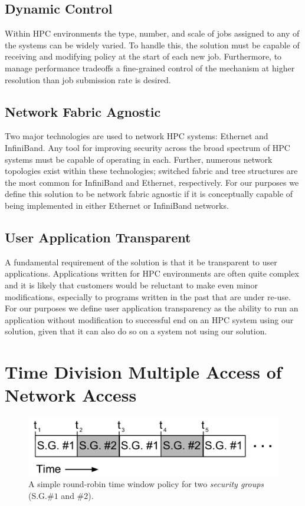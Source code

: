 \documentclass[oneside,12pt]{memoir}
\begin{document}
\section{Dynamic Control}
Within HPC environments the type, number, and scale of jobs assigned to any of the systems can be widely varied. To handle this, the solution must be capable of receiving and modifying policy at the start of each new job. Furthermore, to manage performance tradeoffs a fine-grained control of the mechanism at higher resolution than job submission rate is desired. 
\section{Network Fabric Agnostic}
Two major technologies are used to network HPC systems: Ethernet and InfiniBand. Any tool for improving security across the broad spectrum of HPC systems must be capable of operating in each. Further, numerous network topologies exist within these technologies; switched fabric and tree structures are the most common for InfiniBand and Ethernet, respectively. For our purposes we define this solution to be network fabric agnostic if it is conceptually capable of being implemented in either Ethernet or InfiniBand networks. 
\section{User Application Transparent}
A fundamental requirement of the solution is that it be transparent to user applications. Applications written for HPC environments are often quite complex and it is likely that customers would be reluctant to make even minor modifications, especially to programs written in the past that are under re-use. For our purposes we define user application transparency as the ability to run an application without modification to successful end on an HPC system using our solution, given that it can also do so on a system not using our solution. 
\chapter{Time Division Multiple Access of Network Access}
\label{chap:tdma}
\begin{figure}
\centering
\includegraphics[scale=0.57]{network_access_slots.pdf}
\caption{A simple round-robin time window policy for two \textit{security groups} (S.G.$\#1$ and $\#2$).}
\label{fig:network_access_slots}
\end{figure}
\end{document}
